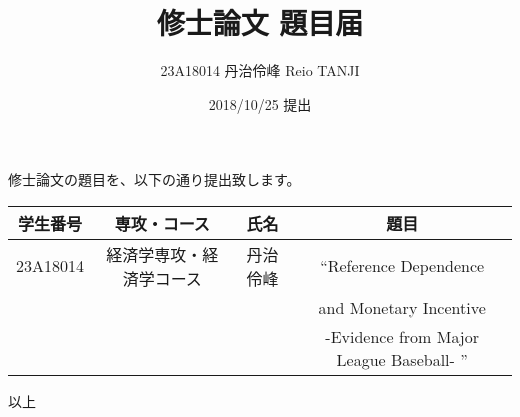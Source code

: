 \documentclass[12pt]{jsarticle}
\begin{document}
\title{修士論文 題目届}
\author{23A18014 丹治伶峰 Reio TANJI}
\date{2018/10/25 提出}
\maketitle


修士論文の題目を、以下の通り提出致します。

\vspace{3zw}

 \begin{tabular}{cccc} \hline
   学生番号 & 専攻・コース & 氏名 & 題目 \\ \hline
   23A18014 & 経済学専攻・経済学コース & 丹治伶峰 & ``Reference Dependence \\
   & & & and Monetary Incentive \\
   & & & -Evidence from Major League Baseball- '' \\ \hline
 \end{tabular}

\vspace{3zw}

\begin{flushright}
  以上
\end{flushright}
\end{document}
